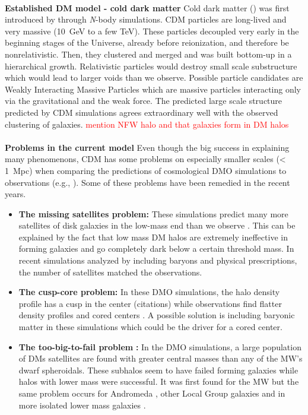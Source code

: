 \\\textbf{Established \ac{DM} model - cold dark matter}
Cold dark matter () was first introduced by \cite{Davis....CDM...1985} through \textit{N}-body simulations. \ac{CDM} particles are long-lived and very massive (\SI{10}{GeV} to a few TeV). These particles decoupled very early in the beginning stages of the Universe, already before reionization, and therefore be nonrelativistic. Then, they clustered and merged and was built bottom-up in a hierarchical growth.  Relativistic particles would destroy small scale substructure which would lead to larger voids than we observe. Possible particle candidates are Weakly Interacting Massive Particles which are massive particles interacting only via the gravitational and the weak force. The predicted large scale structure predicted by \ac{CDM} simulations agrees extraordinary well with the observed clustering of galaxies. \textcolor{red}{mention NFW halo and that galaxies form in DM halos}\\
\\\textbf{Problems in the current model}
Even though the big success in explaining many phenomenons, \ac{CDM} has some problems on especially smaller scales (< \SI{1}{Mpc}) when comparing the predictions of cosmological \ac{DMO} simulations to observations (e.g., \citealp{Bullock...LCDMprobs...2017}). Some of these problems have been remedied in the recent years.
\begin{itemize}
    \item\textbf{The missing satellites problem:} These simulations predict many more satellites of disk galaxies in the low-mass end than we observe \citep{Klypin...missingsatellites...1999, Moore...missingsatellites..1999}. This can be explained by the fact that low mass \ac{DM} halos are extremely ineffective in forming galaxies and go completely dark below a certain threshold mass. In recent simulations analyzed by \citet{Sawala...noCDMproblems...2016} including baryons and physical prescriptions, the number of satellites matched the observations.
    \item \textbf{The cusp-core problem:} In these \ac{DMO} simulations, the halo density profile has a cusp in the center (citations) while observations find flatter density profiles and cored centers \citep{Flores...cuspcoreprob...1994, Moore...cuspcoreprob...1994}. A possible solution is including baryonic matter in these simulations which could be the driver for a cored center. 
    \item \textbf{The too-big-to-fail problem} \citep{Boylan...toobigtoofail...2011}\textbf{:} In the \ac{DMO} simulations, a large population of \acp{DM} satellites are found with greater central masses than any of the \ac{MW}'s dwarf spheroidals. These subhalos seem to have failed forming galaxies while halos with lower mass were successful. It was first found for the \ac{MW} but the same problem occurs for Andromeda \citep{Tollerud...M31tbtf...2014}, other Local Group galaxies \citep{Kirby...LGtbtf...2014} and in more isolated lower mass galaxies \citep{Ferrero...DGtbtf...2012, Papastergis...DGtbtf...2015, Papastergis...DGtbtf...2016}.
    \iffalse\item The planes of satellites problem: \fi
\end{itemize}

